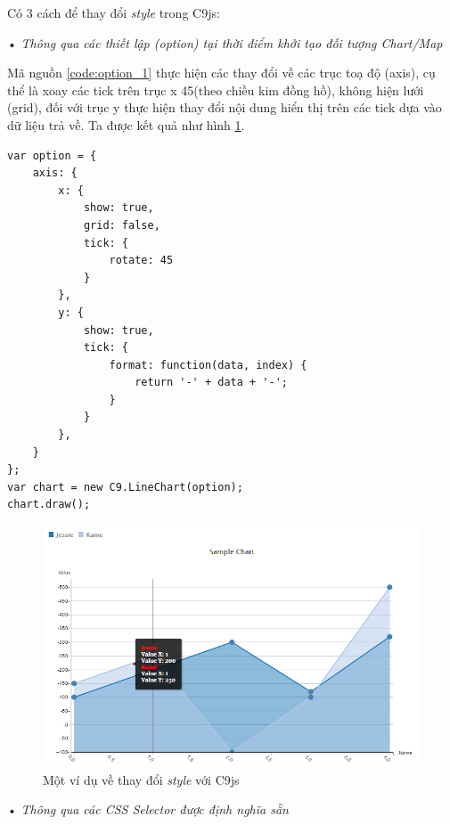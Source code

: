\documentclass[12pt,a4paper]{article}
\begin{document}
Có 3 cách để thay đổi \textit{style} trong C9js:

\begin{list}{}{}
\item[•] \emph{Thông qua các thiết lập (option) tại thời điểm khởi tạo đối tượng Chart/Map}

Mã nguồn \ref{code:option_1} thực hiện các thay đổi về các trục toạ độ (axis), cụ thể là xoay các tick trên trục x 45\degree  (theo chiều kim đồng hồ), không hiện lưới (grid), đối với trục y thực hiện thay đổi nội dung hiển thị trên các tick dựa vào dữ liệu trả về. Ta được kết quả như hình \ref{fig:option_2}.
 
\begin{lstlisting}[caption=Thay đổi \textit{style} tại thời điểm khởi tạo Chart, label={code:option_1}]
var option = {
    axis: {
        x: {
            show: true,
            grid: false,
            tick: {
                rotate: 45
            }
        },
        y: {
            show: true,
            tick: {
                format: function(data, index) {
                    return '-' + data + '-';
                }
            }
        },
    }
};
var chart = new C9.LineChart(option);
chart.draw();
\end{lstlisting}

\begin{figure}[htp]
	\begin{center}
    \includegraphics[scale=.8]{image/option_2}
    \caption{Một ví dụ về thay đổi \textit{style} với C9js}
    \label{fig:option_2}
	\end{center}
\end{figure}

\item[•] \emph{Thông qua các CSS Selector được định nghĩa sẵn}


\end{list}
\end{document}
